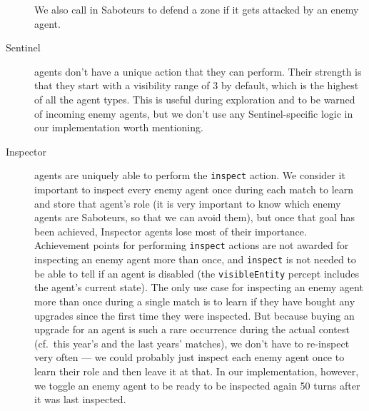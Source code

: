 \begin{description}
        We also call in Saboteurs to defend a zone if it gets attacked by an enemy agent.
    \item[Sentinel] agents don't have a unique action that they can perform.
        Their strength is that they start with a visibility range of 3 by default, which is the highest of all the agent types.
        This is useful during exploration and to be warned of incoming enemy agents, but we don't use any Sentinel-specific logic in our implementation worth mentioning.
    \item[Inspector] agents are uniquely able to perform the \texttt{inspect} action.
        We consider it important to inspect every enemy agent once during each match to learn and store that agent's role (it is very important to know which enemy agents are Saboteurs, so that we can avoid them), but once that goal has been achieved, Inspector agents lose most of their importance.
        Achievement points for performing \texttt{inspect} actions are not awarded for inspecting an enemy agent more than once, and \texttt{inspect} is not needed to be able to tell if an agent is disabled (the \texttt{visibleEntity} percept includes the agent's current state).
        The only use case for inspecting an enemy agent more than once during a single match is to learn if they have bought any upgrades since the first time they were inspected.
        But because buying an upgrade for an agent is such a rare occurrence during the actual contest (cf.\ this year's and the last years' matches), we don't have to re-inspect very often --- we could probably just inspect each enemy agent once to learn their role and then leave it at that.
        In our implementation, however, we toggle an enemy agent to be ready to be inspected again 50 turns after it was last inspected.
\end{description}
